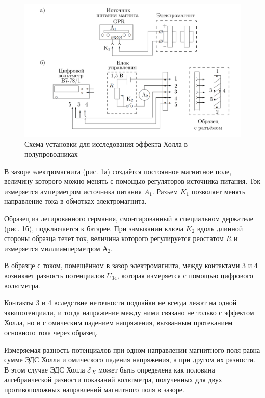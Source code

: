 \documentclass[a4paper,12pt]{article}
\begin{document}
	\begin{figure}[h!]
		\centering
		\includegraphics[width=\linewidth]{Holl2}
		\caption{Схема установки для исследования эффекта Холла в полупроводниках}
		\label{fig:Holl2}
	\end{figure}
  
  	В зазоре электромагнита (рис. 1а) создаётся постоянное магнитное поле, величину которого можно менять с помощью регуляторов источника питания. Ток измеряется амперметром источника питания $A_{1}$. Разъем $K_{1}$ позволяет менять направление тока в обмотках электромагнита.
  
  	Образец из легированного германия, смонтированный в специальном держателе (рис. 1б), подключается к батарее. При замыкании ключа $K_{2}$ вдоль длинной стороны образца течет ток, величина которого регулируется реостатом $R$ и измеряется миллиамперметром $А_{2}$.
  	
  	В образце с током, помещённом в зазор электромагнита, между контактами 3 и 4 возникает разность потенциалов $U_{34}$, которая измеряется с помощью цифрового вольтметра.
  	
  	Контакты 3 и 4 вследствие неточности подпайки не всегда лежат на одной
  	эквипотенциали, и тогда напряжение между ними связано не только с эффектом
  	Холла, но и с омическим падением напряжения, вызванным протеканием основного тока через образец.
  	
  	Измеряемая разность потенциалов при одном направлении
  	магнитного поля равна сумме ЭДС Холла и омического падения напряжения, а
  	при другом  их разности. В этом случае ЭДС Холла $\mathcal{E}_{X}$ может быть определена как половина алгебраической разности показаний вольтметра, полученных для
  	двух противоположных направлений магнитного поля в зазоре.
  	
\end{document}
